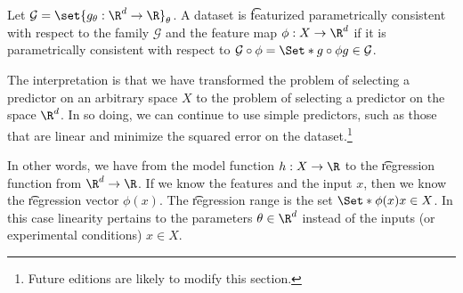 Let $\mathcal{G}  = \set{g_{\theta }: \R ^d \to \R }_{\theta }$.
A dataset is \t{featurized parametrically consistent} with respect to the family $\mathcal{G} $ and the feature map $\phi : X \to \R ^d$ if it is parametrically consistent with respect to $\mathcal{G}  \circ \phi  = \Set*{g \circ \phi }{g \in \mathcal{G} }$.

The interpretation is that we have transformed the problem of selecting a predictor on an arbitrary space $X$ to the problem of selecting a predictor on the space $\R ^d$.
In so doing, we can continue to use simple predictors, such as those that are linear and minimize the squared error on the dataset.\footnote{Future editions are likely to modify this section.}

In other words, we have  from the model function $h: X \to \R $ to the \t{regression function} from $\R ^d \to \R $.
If we know the features and the input $x$, then we know the \t{regression vector} $\phi (x)$.
The \t{regression range} is the set $\Set*{\phi (x)}{x \in X}$.
In this case linearity pertains to the parameters $\theta  \in \R ^d$ instead of the inputs (or experimental conditions) $x \in X$.
